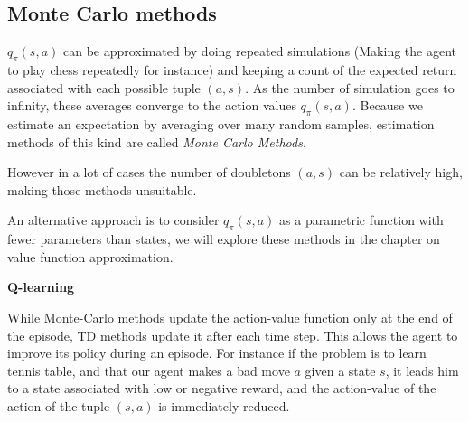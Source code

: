 \documentclass[11pt, onecolumn, a4paper]{report}
\begin{document}
\subsection{Monte Carlo methods}


$q_\pi(s,a)$ can be approximated by doing repeated simulations (Making the agent to play chess repeatedly for instance) and keeping a count of the expected return associated with each possible tuple $(a,s)$. As the number of simulation goes to infinity, these averages converge to the action values $q_\pi(s,a)$. Because we estimate an expectation by averaging over many random samples, estimation methods of this kind are called \textit{Monte Carlo Methods}.


However in a lot of cases the number of doubletons $(a,s)$ can be relatively high, making those methods unsuitable.

An alternative approach is to consider $q_\pi(s,a)$ as a parametric function with fewer parameters than states, we will explore these methods in the chapter on value function approximation.



\textbf{Q-learning}

While Monte-Carlo methods update the action-value function only at the end of the episode, TD methods update it after each time step. This allows the agent to improve its policy during an episode. For instance if the problem is to learn tennis table, and that our agent makes a bad move $a$ given a state $s$, it leads him to a state associated with low or negative reward, and the action-value of the action of the tuple $(s,a)$ is immediately reduced.




\begin{table}
\caption {Methods comparison} \label{tab:title} 
\end{table}
\end{document}
